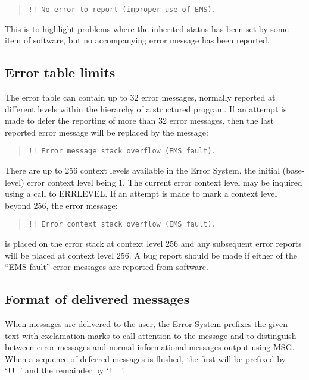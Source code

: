 \documentclass[twoside,11pt]{article}
\newcommand{\xlabel}[1]{}
\renewcommand{\_}{\texttt{\symbol{95}}}
\begin{document}
\begin {quote}
\begin {small}
\begin{verbatim}
!! No error to report (improper use of EMS).
\end{verbatim}
\end {small}
\end {quote}

This is to highlight problems where the inherited status has been set by
some item of software, but no accompanying error message has been reported.

\subsection{\xlabel{error_table_limits}Error table limits}
The error table can contain up to 32 error messages, normally reported at
different levels within the hierarchy of a structured program.
If an attempt is made to defer the reporting of more than 32 error messages,
then the last reported error message will be replaced by the message:

\begin{quote}
\begin {small}
\begin{verbatim}
!! Error message stack overflow (EMS fault).
\end{verbatim}
\end {small}
\end{quote}

There are up to 256 context levels available in the Error System, the
initial (base-level) error context level being 1.
The current error context level may be inquired using a call to ERR\_LEVEL.
If an attempt is made to mark a context level beyond 256, the error message:
\begin{quote}
\begin {small}
\begin{verbatim}
!! Error context stack overflow (EMS fault).
\end{verbatim}
\end {small}
\end{quote}
is placed on the error stack at context level 256 and any subsequent error
reports will be placed at context level 256.
A bug report should be made if either of the ``EMS fault'' error messages are
reported from software.


\subsection{\xlabel{format_of_delivered_messages}Format of delivered messages \label{excl_sect}}
When messages are delivered to the user, the Error System prefixes the given
text with exclamation marks to call attention to the message and to
distinguish between error messages and normal informational messages output
using MSG.
When a sequence of deferred messages is flushed, the first will be prefixed
by `\texttt{!!\ }' and the remainder by `\texttt{!\ \ }'.
\end{document}
